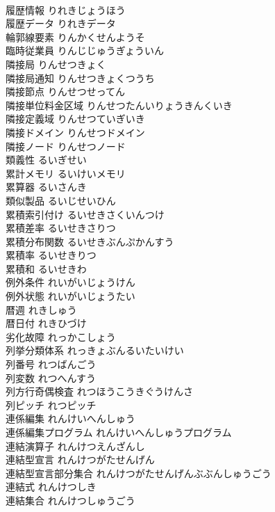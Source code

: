 \documentclass[8pt]{extreport}
\begin{document}
\begin{CJK}{UTF8}{min}
\\	履歴情報	りれきじょうほう	
\\	履歴データ	りれきデータ	
\\	輪郭線要素	りんかくせんようそ	
\\	臨時従業員	りんじじゅうぎょういん	
\\	隣接局	りんせつきょく	
\\	隣接局通知	りんせつきょくつうち	
\\	隣接節点	りんせつせってん	
\\	隣接単位料金区域	りんせつたんいりょうきんくいき	
\\	隣接定義域	りんせつていぎいき	
\\	隣接ドメイン	りんせつドメイン	
\\	隣接ノード	りんせつノード	
\\	類義性	るいぎせい	
\\	累計メモリ	るいけいメモリ	
\\	累算器	るいさんき	
\\	類似製品	るいじせいひん	
\\	累積索引付け	るいせきさくいんつけ	
\\	累積差率	るいせきさりつ	
\\	累積分布関数	るいせきぶんぷかんすう	
\\	累積率	るいせきりつ	
\\	累積和	るいせきわ	
\\	例外条件	れいがいじょうけん	
\\	例外状態	れいがいじょうたい	
\\	暦週	れきしゅう	
\\	暦日付	れきひづけ	
\\	劣化故障	れっかこしょう	
\\	列挙分類体系	れっきょぶんるいたいけい	
\\	列番号	れつばんごう	
\\	列変数	れつへんすう	
\\	列方行奇偶検査	れつほうこうきぐうけんさ	
\\	列ピッチ	れつピッチ	
\\	連係編集	れんけいへんしゅう	
\\	連係編集プログラム	れんけいへんしゅうプログラム	
\\	連結演算子	れんけつえんざんし	
\\	連結型宣言	れんけつがたせんげん	
\\	連結型宣言部分集合	れんけつがたせんげんぶぶんしゅうごう	
\\	連結式	れんけつしき	
\\	連結集合	れんけつしゅうごう	

\end{CJK}
\end{document}
